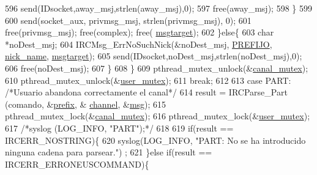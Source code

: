 \begin{DoxyCode}
{{{{{{{{{{596                                                 send(IDsocket,away\_msj,strlen(away\_msj),0);
597                                                 free(away\_msj);
598                                         \}
599 
600                                         send(socket\_aux, privmsg\_msj, strlen(privmsg\_msj), 0);
601                                         free(privmsg\_msj); free(complex); free(
      \hyperlink{_g-2361-06-_p1-_server_8c_a968dcc7e43caeca7959f3c069dcccc6a}{msgtarget}); 
602                                 \}\textcolor{keywordflow}{else}\{
603                                         \textcolor{keywordtype}{char} *noDest\_msj;
604                                         IRCMsg\_ErrNoSuchNick(&noDest\_msj, 
      \hyperlink{_g-2361-06-_p1-_server_8h_a78c658ff923693099f7b621e7c351129}{PREFIJO}, \hyperlink{_g-2361-06-_p1-_server_8c_aabbf66718cda228b924a4a9441eadf62}{nick\_name}, \hyperlink{_g-2361-06-_p1-_server_8c_a968dcc7e43caeca7959f3c069dcccc6a}{msgtarget});
605                                         send(IDsocket,noDest\_msj,strlen(noDest\_msj),0);
606                                         free(noDest\_msj); 
607                                 \}
608                         \}
609                         pthread\_mutex\_unlock(&\hyperlink{_g-2361-06-_p1-_server_8c_ab86a544a49de18195048bac54dd3ac3e}{canal\_mutex});
610                         pthread\_mutex\_unlock(&\hyperlink{_g-2361-06-_p1-_server_8c_a5dedd07a1144d2ab70b74a8e64b6a7c0}{user\_mutex});
611                         \textcolor{keywordflow}{break};
612 
613                 \textcolor{keywordflow}{case} PART: \textcolor{comment}{/*Usuario abandona correctamente el canal*/}
614                         result =  IRCParse\_Part (comando, &\hyperlink{_g-2361-06-_p1-_server_8c_ad2849cf781a4db22cc1b31eaaee50a4f}{prefix}, &
      \hyperlink{_g-2361-06-_p1-_server_8c_a842ca2f026578e5c479c095ff3335969}{channel}, &\hyperlink{_g-2361-06-_p1-_server_8c_a32d2f5216cddb59c7cc8fb2806a7e727}{msg});
615                         pthread\_mutex\_lock(&\hyperlink{_g-2361-06-_p1-_server_8c_ab86a544a49de18195048bac54dd3ac3e}{canal\_mutex});
616                         pthread\_mutex\_lock(&\hyperlink{_g-2361-06-_p1-_server_8c_a5dedd07a1144d2ab70b74a8e64b6a7c0}{user\_mutex});
617                         \textcolor{comment}{/*syslog (LOG\_INFO, "PART");*/}
618 
619                         \textcolor{keywordflow}{if}(result == IRCERR\_NOSTRING)\{
620                                 syslog(LOG\_INFO, \textcolor{stringliteral}{"PART: No se ha introducido ninguna cadena para parsear."})
      ;
621                         \}\textcolor{keywordflow}{else} \textcolor{keywordflow}{if}(result == IRCERR\_ERRONEUSCOMMAND)\{
}}}}}}}}}}
\end{DoxyCode}
